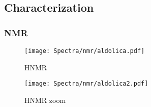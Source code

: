 \documentclass[../Master.tex]{subfiles}
\begin{document}
\subsection{Characterization}
\subsubsection{NMR}

\begin{figure}[h!]
	\centering
	\texttt{[image: Spectra/nmr/aldolica.pdf]}
	\caption{HNMR}
\end{figure}

\begin{figure}[h!]
	\centering
	\texttt{[image: Spectra/nmr/aldolica2.pdf]}
	\caption{HNMR zoom}

\end{figure}
\end{document}
